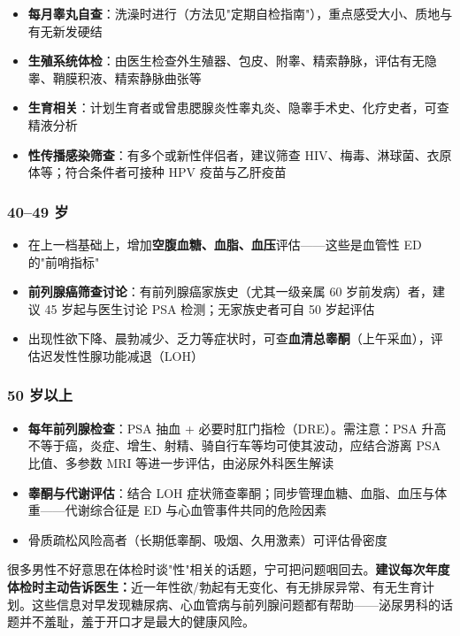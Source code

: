 \begin{itemize}
	\item \textbf{每月睾丸自查}：洗澡时进行（方法见"定期自检指南"），重点感受大小、质地与有无新发硬结
	\item \textbf{生殖系统体检}：由医生检查外生殖器、包皮、附睾、精索静脉，评估有无隐睾、鞘膜积液、精索静脉曲张等
	\item \textbf{生育相关}：计划生育者或曾患腮腺炎性睾丸炎、隐睾手术史、化疗史者，可查精液分析
	\item \textbf{性传播感染筛查}：有多个或新性伴侣者，建议筛查 HIV、梅毒、淋球菌、衣原体等；符合条件者可接种 HPV 疫苗与乙肝疫苗
\end{itemize}

\subsubsection{40--49 岁}

\begin{itemize}
	\item 在上一档基础上，增加\textbf{空腹血糖、血脂、血压}评估——这些是血管性 ED 的"前哨指标"
	\item \textbf{前列腺癌筛查讨论}：有前列腺癌家族史（尤其一级亲属 60 岁前发病）者，建议 45 岁起与医生讨论 PSA 检测；无家族史者可自 50 岁起评估
	\item 出现性欲下降、晨勃减少、乏力等症状时，可查\textbf{血清总睾酮}（上午采血），评估迟发性性腺功能减退（LOH）
\end{itemize}

\subsubsection{50 岁以上}

\begin{itemize}
	\item \textbf{每年前列腺检查}：PSA 抽血 + 必要时肛门指检（DRE）。需注意：PSA 升高不等于癌，炎症、增生、射精、骑自行车等均可使其波动，应结合游离 PSA 比值、多参数 MRI 等进一步评估，由泌尿外科医生解读
	\item \textbf{睾酮与代谢评估}：结合 LOH 症状筛查睾酮；同步管理血糖、血脂、血压与体重——代谢综合征是 ED 与心血管事件共同的危险因素
	\item 骨质疏松风险高者（长期低睾酮、吸烟、久用激素）可评估骨密度
\end{itemize}

\begin{tcolorbox}[colback=pink!5!white,colframe=red!50!black,title=贴心小叮咛]
很多男性不好意思在体检时谈"性"相关的话题，宁可把问题咽回去。\textbf{建议每次年度体检时主动告诉医生：}近一年性欲/勃起有无变化、有无排尿异常、有无生育计划。这些信息对早发现糖尿病、心血管病与前列腺问题都有帮助——泌尿男科的话题并不羞耻，羞于开口才是最大的健康风险。
\end{tcolorbox}

